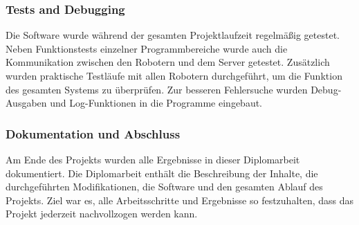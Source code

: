 \subsubsection{Tests and Debugging}
Die Software wurde während der gesamten Projektlaufzeit regelmäßig getestet.
Neben Funktionstests einzelner Programmbereiche wurde auch die Kommunikation zwischen den Robotern und dem Server getestet.
Zusätzlich wurden praktische Testläufe mit allen Robotern durchgeführt, um die Funktion des gesamten Systems zu überprüfen.
Zur besseren Fehlersuche wurden Debug-Ausgaben und Log-Funktionen in die Programme eingebaut.
\subsubsection{Dokumentation und Abschluss}
Am Ende des Projekts wurden alle Ergebnisse in dieser Diplomarbeit dokumentiert.
Die Diplomarbeit enthält die Beschreibung der Inhalte, die durchgeführten Modifikationen, die Software und den gesamten Ablauf des Projekts.
Ziel war es, alle Arbeitsschritte und Ergebnisse so festzuhalten, dass das Projekt jederzeit nachvollzogen werden kann.